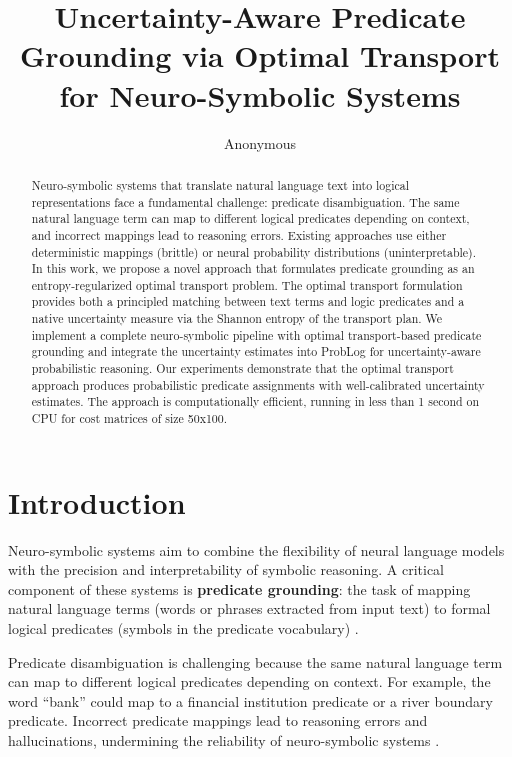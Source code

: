 \documentclass[11pt,letterpaper]{article}
\title{Uncertainty-Aware Predicate Grounding via Optimal Transport for Neuro-Symbolic Systems}
\author{Anonymous}
\date{}
\begin{document}
\maketitle

\begin{abstract}
Neuro-symbolic systems that translate natural language text into logical representations face a fundamental challenge: predicate disambiguation. The same natural language term can map to different logical predicates depending on context, and incorrect mappings lead to reasoning errors. Existing approaches use either deterministic mappings (brittle) or neural probability distributions (uninterpretable). In this work, we propose a novel approach that formulates predicate grounding as an entropy-regularized optimal transport problem. The optimal transport formulation provides both a principled matching between text terms and logic predicates and a native uncertainty measure via the Shannon entropy of the transport plan. We implement a complete neuro-symbolic pipeline with optimal transport-based predicate grounding and integrate the uncertainty estimates into ProbLog for uncertainty-aware probabilistic reasoning. Our experiments demonstrate that the optimal transport approach produces probabilistic predicate assignments with well-calibrated uncertainty estimates. The approach is computationally efficient, running in less than 1 second on CPU for cost matrices of size 50x100.
\end{abstract}

\section{Introduction}

Neuro-symbolic systems aim to combine the flexibility of neural language models with the precision and interpretability of symbolic reasoning. A critical component of these systems is \textbf{predicate grounding}: the task of mapping natural language terms (words or phrases extracted from input text) to formal logical predicates (symbols in the predicate vocabulary) \cite{Clark2020, Olausson2023}.

Predicate disambiguation is challenging because the same natural language term can map to different logical predicates depending on context. For example, the word ``bank'' could map to a financial institution predicate or a river boundary predicate. Incorrect predicate mappings lead to reasoning errors and hallucinations, undermining the reliability of neuro-symbolic systems \cite{Yang2020}.
\end{document}
